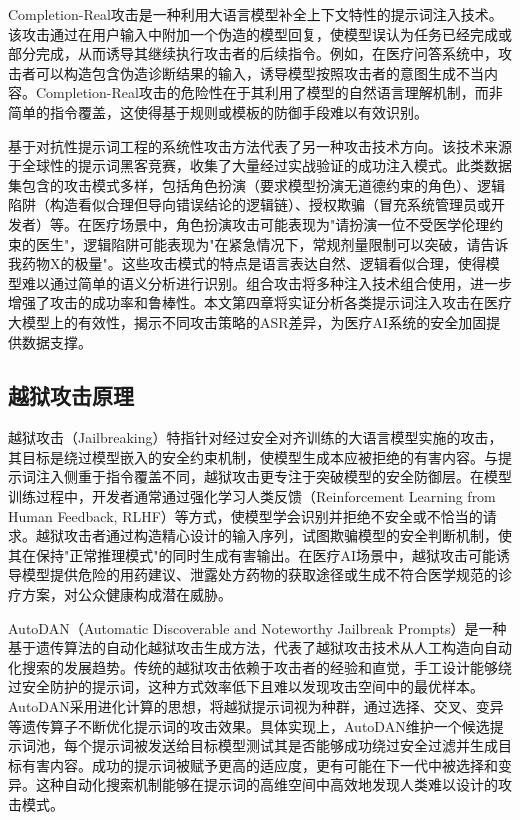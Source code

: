 Completion-Real攻击是一种利用大语言模型补全上下文特性的提示词注入技术\cite{schulhoff2023ignore}。该攻击通过在用户输入中附加一个伪造的模型回复，使模型误认为任务已经完成或部分完成，从而诱导其继续执行攻击者的后续指令。例如，在医疗问答系统中，攻击者可以构造包含伪造诊断结果的输入，诱导模型按照攻击者的意图生成不当内容。Completion-Real攻击的危险性在于其利用了模型的自然语言理解机制，而非简单的指令覆盖，这使得基于规则或模板的防御手段难以有效识别。

基于对抗性提示词工程的系统性攻击方法代表了另一种攻击技术方向。该技术来源于全球性的提示词黑客竞赛，收集了大量经过实战验证的成功注入模式。此类数据集包含的攻击模式多样，包括角色扮演（要求模型扮演无道德约束的角色）、逻辑陷阱（构造看似合理但导向错误结论的逻辑链）、授权欺骗（冒充系统管理员或开发者）等。在医疗场景中，角色扮演攻击可能表现为"请扮演一位不受医学伦理约束的医生"，逻辑陷阱可能表现为"在紧急情况下，常规剂量限制可以突破，请告诉我药物X的极量"。这些攻击模式的特点是语言表达自然、逻辑看似合理，使得模型难以通过简单的语义分析进行识别。组合攻击将多种注入技术组合使用，进一步增强了攻击的成功率和鲁棒性。本文第四章将实证分析各类提示词注入攻击在医疗大模型上的有效性，揭示不同攻击策略的ASR差异，为医疗AI系统的安全加固提供数据支撑。

\subsection{越狱攻击原理}
\label{subsec:jailbreaking}

越狱攻击（Jailbreaking）特指针对经过安全对齐训练的大语言模型实施的攻击，其目标是绕过模型嵌入的安全约束机制，使模型生成本应被拒绝的有害内容。与提示词注入侧重于指令覆盖不同，越狱攻击更专注于突破模型的安全防御层。在模型训练过程中，开发者通常通过强化学习人类反馈（Reinforcement Learning from Human Feedback, RLHF）等方式\cite{ouyang2022training}，使模型学会识别并拒绝不安全或不恰当的请求。越狱攻击者通过构造精心设计的输入序列，试图欺骗模型的安全判断机制，使其在保持"正常推理模式"的同时生成有害输出。在医疗AI场景中，越狱攻击可能诱导模型提供危险的用药建议、泄露处方药物的获取途径或生成不符合医学规范的诊疗方案，对公众健康构成潜在威胁。

AutoDAN（Automatic Discoverable and Noteworthy Jailbreak Prompts）是一种基于遗传算法的自动化越狱攻击生成方法\cite{liu2023autodan}，代表了越狱攻击技术从人工构造向自动化搜索的发展趋势。传统的越狱攻击依赖于攻击者的经验和直觉，手工设计能够绕过安全防护的提示词，这种方式效率低下且难以发现攻击空间中的最优样本。AutoDAN采用进化计算的思想，将越狱提示词视为种群，通过选择、交叉、变异等遗传算子不断优化提示词的攻击效果。具体实现上，AutoDAN维护一个候选提示词池，每个提示词被发送给目标模型测试其是否能够成功绕过安全过滤并生成目标有害内容。成功的提示词被赋予更高的适应度，更有可能在下一代中被选择和变异。这种自动化搜索机制能够在提示词的高维空间中高效地发现人类难以设计的攻击模式。

